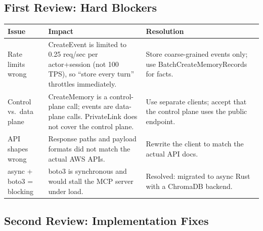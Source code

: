 \documentclass[11pt,letterpaper]{article}
\renewcommand{\arraystretch}{1.4}
\begin{document}
\subsection*{First Review: Hard Blockers}

\begin{center}
\small
\renewcommand{\arraystretch}{1.35}
\begin{tabularx}{\textwidth}{>{\raggedright\arraybackslash}p{3.2cm} Y Y}
\textbf{\color{dangerred}Issue} & \textbf{\color{dangerred}Impact} & \textbf{\color{dangerred}Resolution} \\
\midrule
{}
Rate limits wrong & CreateEvent is limited to 0.25 req/sec per actor+session (not 100 TPS), so ``store every turn'' throttles immediately. & Store coarse-grained events only; use BatchCreateMemoryRecords for facts. \\
Control vs.\ data plane & CreateMemory is a control-plane call; events are data-plane calls. PrivateLink does not cover the control plane. & Use separate clients; accept that the control plane uses the public endpoint. \\
API shapes wrong & Response paths and payload formats did not match the actual AWS APIs. & Rewrite the client to match the actual API docs. \\
async + boto3 = blocking & boto3 is synchronous and would stall the MCP server under load. & Resolved: migrated to async Rust with a ChromaDB backend. \\
\bottomrule
\end{tabularx}
\end{center}

\subsection*{Second Review: Implementation Fixes}
\end{document}
